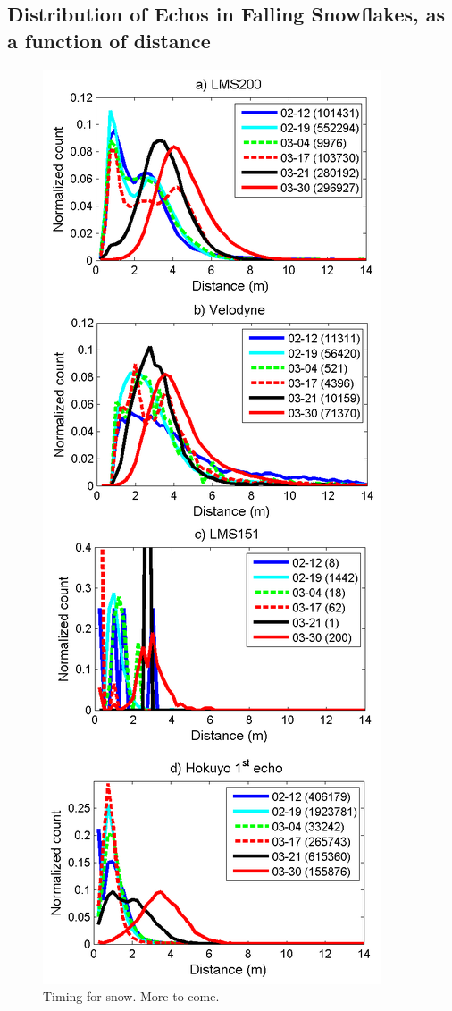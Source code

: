 \subsection{Distribution of Echos in Falling Snowflakes, as a function of distance}
\begin{figure}[th]
    \centering
    \includegraphics[width=0.95\linewidth]{./img/Histograms.png}
    \caption{Timing for snow. More to come.}
    \label{fig:Histograms}
\end{figure}


